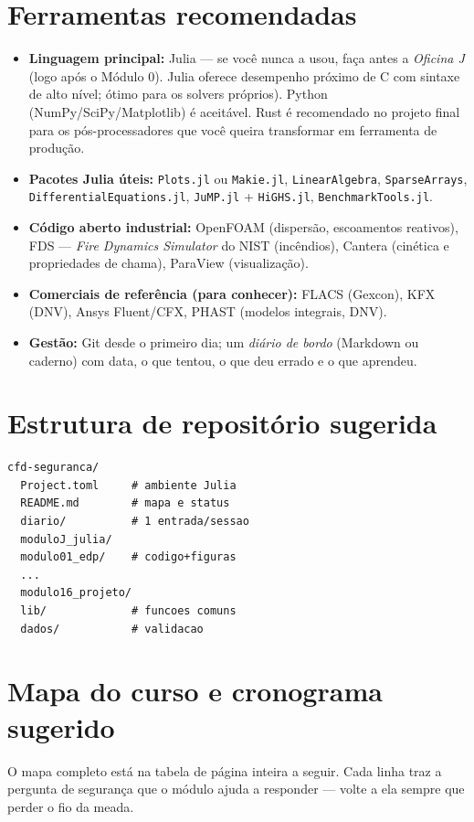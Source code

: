 \documentclass[10pt,a4paper,twocolumn,openany]{report}
\begin{document}
\section*{Ferramentas recomendadas}
\begin{itemize}
  \item \textbf{Linguagem principal:} Julia --- se você nunca a usou, faça
        antes a \emph{Oficina J} (logo após o Módulo 0). Julia oferece desempenho próximo de C com
        sintaxe de alto nível; ótimo para os solvers próprios). Python
        (NumPy/SciPy/Matplotlib) é aceitável. Rust é recomendado no projeto
        final para os pós-processadores que você queira transformar em
        ferramenta de produção.
  \item \sloppy\textbf{Pacotes Julia úteis:} \texttt{Plots.jl} ou \texttt{Makie.jl},
        \texttt{LinearAlgebra}, \texttt{SparseArrays},
        \texttt{DifferentialEquations.jl}, \texttt{JuMP.jl} + \texttt{HiGHS.jl},
        \texttt{BenchmarkTools.jl}.
  \item \textbf{Código aberto industrial:} OpenFOAM (dispersão, escoamentos
        reativos), FDS --- \emph{Fire Dynamics Simulator} do NIST (incêndios),
        Cantera (cinética e propriedades de chama), ParaView (visualização).
  \item \textbf{Comerciais de referência (para conhecer):} FLACS (Gexcon),
        KFX (DNV), Ansys Fluent/CFX, PHAST (modelos integrais, DNV).
  \item \textbf{Gestão:} Git desde o primeiro dia; um \emph{diário de bordo}
        (Markdown ou caderno) com data, o que tentou, o que deu errado e o que
        aprendeu.
\end{itemize}

\section*{Estrutura de repositório sugerida}
\begin{lstlisting}[language={},numbers=none]
cfd-seguranca/
  Project.toml     # ambiente Julia
  README.md        # mapa e status
  diario/          # 1 entrada/sessao
  moduloJ_julia/
  modulo01_edp/    # codigo+figuras
  ...
  modulo16_projeto/
  lib/             # funcoes comuns
  dados/           # validacao
\end{lstlisting}

\section*{Mapa do curso e cronograma sugerido}
O mapa completo está na tabela de página inteira a seguir. Cada linha traz a
pergunta de segurança que o módulo ajuda a responder --- volte a ela sempre
que perder o fio da meada.
\end{document}
